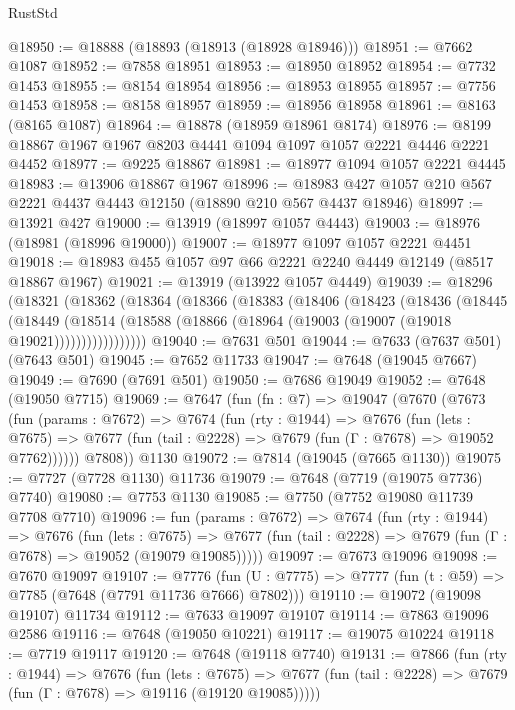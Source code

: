 \begin{lexlean}{RustStd}
\begin{coremodule}
@18950 := @18888 (@18893 (@18913 (@18928 @18946)))
@18951 := @7662 @1087
@18952 := @7858 @18951
@18953 := @18950 @18952
@18954 := @7732 @1453
@18955 := @8154 @18954
@18956 := @18953 @18955
@18957 := @7756 @1453
@18958 := @8158 @18957
@18959 := @18956 @18958
@18961 := @8163 (@8165 @1087)
@18964 := @18878 (@18959 @18961 @8174)
@18976 := @8199 @18867 @1967 @1967 @8203 @4441 @1094 @1097 @1057 @2221 @4446 @2221 @4452
@18977 := @9225 @18867
@18981 := @18977 @1094 @1057 @2221 @4445
@18983 := @13906 @18867 @1967
@18996 := @18983 @427 @1057 @210 @567 @2221 @4437 @4443 @12150 (@18890 @210 @567 @4437 @18946)
@18997 := @13921 @427
@19000 := @13919 (@18997 @1057 @4443)
@19003 := @18976 (@18981 (@18996 @19000))
@19007 := @18977 @1097 @1057 @2221 @4451
@19018 := @18983 @455 @1057 @97 @66 @2221 @2240 @4449 @12149 (@8517 @18867 @1967)
@19021 := @13919 (@13922 @1057 @4449)
@19039 := @18296
    (@18321
      (@18362
        (@18364
          (@18366
            (@18383
              (@18406
                (@18423
                  (@18436
                    (@18445
                      (@18449
                        (@18514
                          (@18588 (@18866 (@18964 (@19003 (@19007 (@19018 @19021)))))))))))))))))
@19040 := @7631 @501
@19044 := @7633 (@7637 @501) (@7643 @501)
@19045 := @7652 @11733
@19047 := @7648 (@19045 @7667)
@19049 := @7690 (@7691 @501)
@19050 := @7686 @19049
@19052 := @7648 (@19050 @7715)
@19069 := @7647
    (fun (fn : @7) =>
    @19047
      (@7670
        (@7673
          (fun (params : @7672) =>
          @7674
            (fun (rty : @1944) =>
            @7676
              (fun (lets : @7675) =>
              @7677 (fun (tail : @2228) => @7679 (fun (Γ : @7678) => @19052 @7762))))))
        @7808))
    @1130
@19072 := @7814 (@19045 (@7665 @1130))
@19075 := @7727 (@7728 @1130) @11736
@19079 := @7648 (@7719 (@19075 @7736) @7740)
@19080 := @7753 @1130
@19085 := @7750 (@7752 @19080 @11739 @7708 @7710)
@19096 := fun (params : @7672) =>
  @7674
    (fun (rty : @1944) =>
    @7676
      (fun (lets : @7675) =>
      @7677 (fun (tail : @2228) => @7679 (fun (Γ : @7678) => @19052 (@19079 @19085)))))
@19097 := @7673 @19096
@19098 := @7670 @19097
@19107 := @7776
    (fun (U : @7775) => @7777 (fun (t : @59) => @7785 (@7648 (@7791 @11736 @7666) @7802)))
@19110 := @19072 (@19098 @19107) @11734
@19112 := @7633 @19097 @19107
@19114 := @7863 @19096 @2586
@19116 := @7648 (@19050 @10221)
@19117 := @19075 @10224
@19118 := @7719 @19117
@19120 := @7648 (@19118 @7740)
@19131 := @7866
    (fun (rty : @1944) =>
    @7676
      (fun (lets : @7675) =>
      @7677 (fun (tail : @2228) => @7679 (fun (Γ : @7678) => @19116 (@19120 @19085)))))

\end{coremodule}
\end{lexlean}
